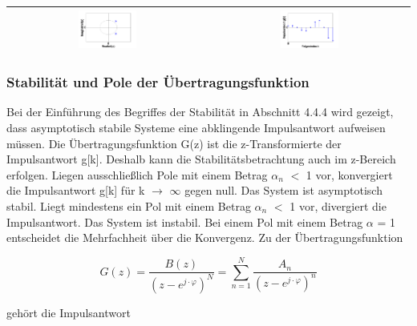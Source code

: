 \begin{table}[H]
{\begin{tabular}{| c | c |}
\parbox[c][1.4in][c]{3.3in}{\centerline{\includegraphics[width=0.3\textwidth]{Kapitel6/Table/image11.png}}} & 
\parbox[c][1.4in][c]{3.3in}{\centerline{\includegraphics[width=0.3\textwidth]{Kapitel6/Table/image12.png}}}\\ \hline


\end{tabular}%
}
\label{tab:sixseven}
\end{table}
\clearpage
\subsubsection{Stabilit\"{a}t und Pole der \"{U}bertragungsfunktion}

\noindent Bei der Einf\"{u}hrung des Begriffes der Stabilit\"{a}t in Abschnitt 4.4.4 wird gezeigt, dass asymptotisch stabile Systeme eine abklingende Impulsantwort aufweisen m\"{u}ssen. Die \"{U}bertragungsfunktion G(z) ist die z-Transformierte der Impulsantwort g[k]. Deshalb kann die Stabilit\"{a}tsbetrachtung auch im z-Bereich erfolgen. Liegen ausschlie{\ss}lich Pole mit einem Betrag {\textbar}$\alpha_{n}${\textbar} $\mathrm{<}$ 1 vor, konvergiert die Impulsantwort g[k] f\"{u}r k $\rightarrow$ $\infty$ gegen null. Das System ist asymptotisch stabil. Liegt mindestens ein Pol mit einem Betrag {\textbar}$\alpha_{n}${\textbar} $\mathrm{<}$ 1 vor, divergiert die Impulsantwort. Das System ist instabil. Bei einem Pol mit einem Betrag {\textbar}$\alpha${\textbar} = 1 entscheidet die Mehrfachheit \"{u}ber die Konvergenz. Zu der \"{U}bertragungsfunktion

\begin{equation}\label{eq:sixsonehundredfourteen}
G\left(z\right)=\frac{B\left(z\right)}{\left(z-e^{j\cdot \varphi } \right)^{N} } =\sum _{n=1}^{N}\frac{A_{n} }{\left(z-e^{j\cdot \varphi } \right)^{n} }
\end{equation}

\noindent geh\"{o}rt die Impulsantwort

